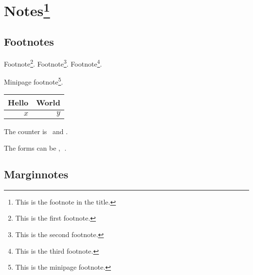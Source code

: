 \section{Notes\protect\footnote{This is the footnote in the title.}}
\subsection{Footnotes}
Footnote\footnote{This is the first footnote.}. Footnote\footnote{This is the second footnote.}. Footnote\footnote[4]{This is the third footnote.}.

\begin{minipage}{20em}
    Minipage footnote\footnote{This is the minipage footnote.}.     %
\end{minipage}

\begin{tabular}{r|r}
    Hello & World\footnotemark \\ \hline                            %
    $x$ & $y$
\end{tabular}

The counter is \thefootnote\ and \thempfootnote.

The forms can be , \textcircled{}.

\subsection{Marginnotes}


{\reversemarginpar
{}
\normalmarginpar
{}}